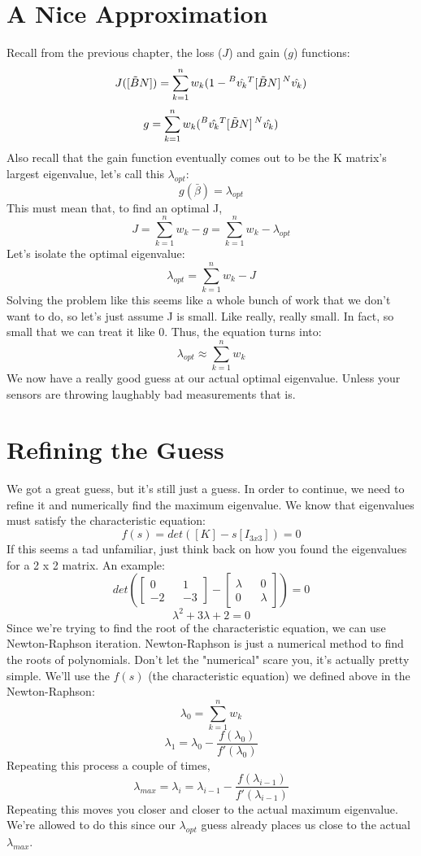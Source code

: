 \documentclass[a4paper,14pt]{extreport}
\newcommand{\vk}[1]{\prescript{#1}{}{\hat{v_k}}}
\begin{document}
\section{A Nice Approximation}
Recall from the previous chapter, the loss ($J$) and gain ($g$) functions:
\[
J([\tilde{B}N]) = \sum^n_{k=1} w_k (1- \vk{B}^T[\tilde{B}N]\vk{N})
\]
\[
g = \sum^n_{k=1} w_k (\vk{B}^T[\tilde{B}N]\vk{N})
\]
Also recall that the gain function eventually comes out to be the K matrix's largest eigenvalue, let's call this $\lambda_{opt}$:
\[
g(\bar{\beta}) = \lambda_{opt}
\]
This must mean that, to find an optimal J,
\[
J = \sum^n_{k=1} w_k - g = \sum^n_{k=1} w_k - \lambda_{opt}
\]
Let's isolate the optimal eigenvalue:
\[
\lambda_{opt} = \sum^n_{k=1} w_k - J
\]
Solving the problem like this seems like a whole bunch of work that we don't want to do, so let's just assume J is small. Like really, really small. In fact, so small that we can treat it like 0. Thus, the equation turns into:
\[
\lambda_{opt} \approx \sum^n_{k=1} w_k
\]
We now have a really good guess at our actual optimal eigenvalue. Unless your sensors are throwing laughably bad measurements that is.

\section{Refining the Guess}
We got a great guess, but it's still just a guess. In order to continue, we need to refine it and numerically find the maximum eigenvalue. We know that eigenvalues must satisfy the characteristic equation:
\[
f(s) = det([K]-s[I_{3x3}]) = 0
\]
If this seems a tad unfamiliar, just think back on how you found the eigenvalues for a 2 x 2 matrix. An example:
\[
det(
\begin{bmatrix}
0&&1\\-2&&-3
\end{bmatrix} - 
\begin{bmatrix}
\lambda&&0\\0&&\lambda
\end{bmatrix}) = 0
\]
\[
\lambda^2+3\lambda+2=0
\]
Since we're trying to find the root of the characteristic equation, we can use Newton-Raphson iteration. Newton-Raphson is just a numerical method to find the roots of polynomials. Don't let the "numerical" scare you, it's actually pretty simple. We'll use the $f(s)$  (the characteristic equation) we defined above in the Newton-Raphson:
\[
\lambda_0 = \sum^n_{k=1} w_k
\]
\[
\lambda_1 = \lambda_0 - \dfrac{f(\lambda_0)}{f'(\lambda_0)}
\]
Repeating this process a couple of times,
\[
\lambda_{max} = \lambda_i = \lambda_{i-1} - \dfrac{f(\lambda_{i-1})}{f'(\lambda_{i-1})}
\]
Repeating this moves you closer and closer to the actual maximum eigenvalue. We're allowed to do this since our $\lambda_{opt}$ guess already places us close to the actual $\lambda_{max}$.
\end{document}
